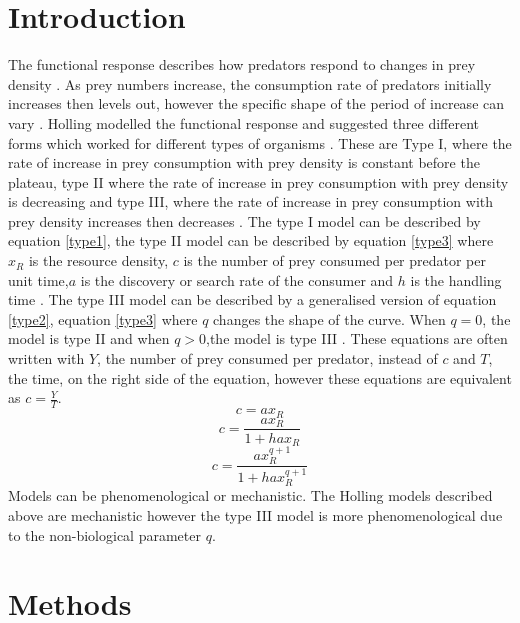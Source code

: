 \documentclass{article}
\begin{document}
\section{Introduction}
The functional response describes how predators respond to changes in prey density \cite{hollingsawfly1959}\cite{Solomon1949}. As prey numbers increase, the consumption rate of predators initially increases then levels out, however the specific shape of the period of increase can vary \cite{hollingsawfly1959}. Holling modelled the functional response and suggested three different forms which worked for different types of organisms \cite{hollingsawfly1959}. These are Type I, where the rate of increase in prey consumption with prey density is constant before the plateau, type II where the rate of increase in prey consumption with prey density is decreasing and type III, where the  rate of increase in prey consumption with prey density increases then decreases \cite{hollingsawfly1959}. The type I model can be described by equation \ref{type1}, the type II model can be described by equation \ref{type3} where $x_R$ is the resource density, $c$ is the number of prey consumed per predator per unit time,$a$ is the discovery or search rate of the consumer and $h$ is the handling time \cite{Dawes2013}\cite{Holling1959}. The type III model can be described by a generalised version of equation \ref{type2}, equation \ref{type3} where $q$ changes the shape of the curve\cite{Dawes2013}. %
When $q=0$, the model is type II and when $q>0$,the model is type III \cite{Dawes2013}. These equations are often written with $Y$, the number of prey consumed per predator, instead of $c$ and $T$, the time, on the right side of the equation, however these equations are equivalent as $c=\frac{Y}{T}$.%
\begin{equation}\label{type1}
    c=ax_R
\end{equation}
\begin{equation}\label{type2}
c=\frac{ax_R}{1+hax_R}
\end{equation}
\begin{equation}\label{type3}
c=\frac{ax_R^{q+1}}{1+hax_R^{q+1}}
\end{equation}
Models can be phenomenological or mechanistic. %
The Holling models described above are mechanistic however the type III model is more phenomenological due to the non-biological parameter $q$.
%
%
\section{Methods}
\end{document}
